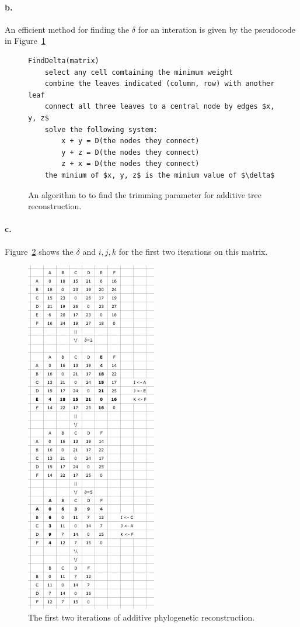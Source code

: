 \documentclass[12pt]{article}
\begin{document}
\paragraph{b.} 
An efficient method for finding the $\delta$ for an interation is given by the pseudocode in Figure~\ref{finddelta}

\begin{figure}[htb]
\centering
\begin{lstlisting}
FindDelta(matrix)
	select any cell comtaining the minimum weight
	combine the leaves indicated (column, row) with another leaf
	connect all three leaves to a central node by edges $x, y, z$
	solve the following system:
		x + y = D(the nodes they connect)
		y + z = D(the nodes they connect)
		z + x = D(the nodes they connect)
	the minium of $x, y, z$ is the minium value of $\delta$
\end{lstlisting}
	\caption{An algorithm to to find the trimming parameter for additive tree reconstruction.}
	\label{finddelta}
\end{figure}

\paragraph{c.} %
Figure~\ref{twoiter} shows the $\delta$ and $i,j,k$ for the first two iterations on this matrix.

\begin{figure}[htb]
	\begin{center}
		\includegraphics[width=2.25in]{twoiter}
	\end{center}
	\caption{The first two iterations of additive phylogenetic reconstruction.}
	\label{twoiter}
\end{figure}
\end{document}
